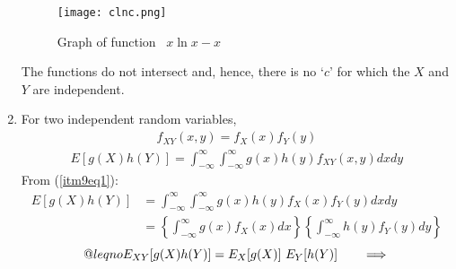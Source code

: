 \documentclass[11pt]{article}
\makeatletter
\newcommand{\LeftEqNo}{\let\veqno\@@leqno}
\makeatother
\begin{document}
\begin{enumerate}[1: ]
	\begin{figure}[H]
	\centering
	\texttt{[image: clnc.png]}
	\caption{Graph of function \ $x\ln x-x$}
	\end{figure}
	The functions do not intersect and, hence, there is no `$c$' for which
	the $X$ and $Y$ are independent.
\item For two independent random variables,
	\begin{align}
		f_{XY}(x,y) = f_{X}(x) f_{Y}(y)		\label{itm9eq1}
	\end{align}
	\begin{align*}
		E[g(X) h(Y)] = \int_{-\infty}^\infty \int_{-\infty}^\infty 
		g(x) h(y) f_{XY}(x,y) dx dy
	\end{align*}
	From (\ref{itm9eq1}):
	\begin{align*}
		E[g(X) h(Y)] &= \int_{-\infty}^\infty \int_{-\infty}^\infty 
		g(x) h(y) f_{X}(x) f_{Y}(y) dx dy	\\
		&= \left\{ \int_{-\infty}^\infty g(x) f_{X}(x) dx \right\}
		\left\{ \int_{-\infty}^\infty h(y) f_{Y}(y) dy \right\}
	\end{align*}
	\begin{equation}\LeftEqNo
		E_{XY}[g(X) h(Y)] = E_X[g(X)] \ E_Y[h(Y)] \tag*{$\implies$}
	\end{equation}
\end{enumerate}
\end{document}

